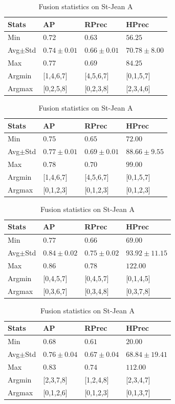 \begin{table}
  \centering
  \caption{Fusion statistics on St-Jean A}
  \label{tab:fusion_stats_A}

  \begin{tabular}{l l l l}
    \toprule
    Stats
    & AP
    & RPrec
    & HPrec \\
    \midrule
    Min & $0.72$ & $0.63$ & $56.25$ \\
    Avg$\pm$Std & $0.74\pm0.01$ & $0.66\pm0.01$ & $70.78\pm8.00$ \\
    Max & $0.77$ & $0.69$ & $84.25$ \\
    Argmin & [1,4,6,7] & [4,5,6,7] & [0,1,5,7] \\
    Argmax & [0,2,5,8] & [0,2,3,8] & [2,3,4,6] \\
    \bottomrule
  \end{tabular}

  \begin{tabular}{l l l l}
    \toprule
    Stats
    & AP
    & RPrec
    & HPrec \\
    \midrule
    Min & $0.75$ & $0.65$ & $72.00$ \\
    Avg$\pm$Std & $0.77\pm0.01$ & $0.69\pm0.01$ & $88.66\pm9.55$ \\
    Max & $0.78$ & $0.70$ & $99.00$ \\
    Argmin & [1,4,6,7] & [4,5,6,7] & [0,1,5,7] \\
    Argmax & [0,1,2,3] & [0,1,2,3] & [0,1,2,3] \\
    \bottomrule
  \end{tabular}

  \begin{tabular}{l l l l}
    \toprule
    Stats
    & AP
    & RPrec
    & HPrec \\
    \midrule
    Min & $0.77$ & $0.66$ & $69.00$ \\
    Avg$\pm$Std & $0.84\pm0.02$ & $0.75\pm0.02$ & $93.92\pm11.15$ \\
    Max & $0.86$ & $0.78$ & $122.00$ \\
    Argmin & [0,4,5,7] & [0,4,5,7] & [0,1,4,5] \\
    Argmax & [0,3,6,7] & [0,3,4,8] & [0,3,7,8] \\
    \bottomrule
  \end{tabular}

  \begin{tabular}{l l l l}
    \toprule
    Stats
    & AP
    & RPrec
    & HPrec \\
    \midrule
    Min & $0.68$ & $0.61$ & $20.00$ \\
    Avg$\pm$Std & $0.76\pm0.04$ & $0.67\pm0.04$ & $68.84\pm19.41$ \\
    Max & $0.83$ & $0.74$ & $112.00$ \\
    Argmin & [2,3,7,8] & [1,2,4,8] & [2,3,4,7] \\
    Argmax & [0,1,2,6] & [0,1,2,3] & [0,1,3,7] \\
    \bottomrule
  \end{tabular}
\end{table}


